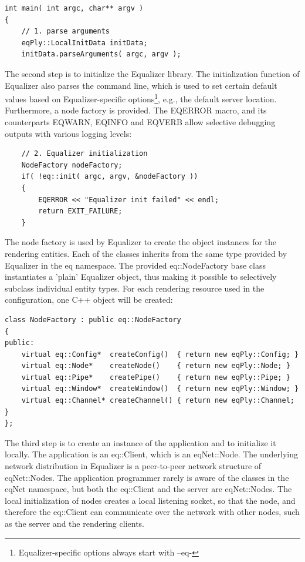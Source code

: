 \documentclass[10pt,a4]{scrartcl}
\begin{document}
{\footnotesize\begin{lstlisting}
int main( int argc, char** argv )
{
    // 1. parse arguments
    eqPly::LocalInitData initData;
    initData.parseArguments( argc, argv );
\end{lstlisting}}

The second step is to initialize the Equalizer library. The
initialization function of Equalizer also parses the command line, which
is used to set certain default values based on Equalizer-specific
options\footnote{Equalizer-specific options always start with --eq-},
e.g., the default server location. Furthermore, a node factory is
provided. The \textsf{EQERROR} macro, and its counterparts
\textsf{EQWARN}, \textsf{EQINFO} and \textsf{EQVERB} allow selective
debugging outputs with various logging levels:

{\footnotesize\begin{lstlisting}
    // 2. Equalizer initialization
    NodeFactory nodeFactory;
    if( !eq::init( argc, argv, &nodeFactory ))
    {
        EQERROR << "Equalizer init failed" << endl;
        return EXIT_FAILURE;
    }
\end{lstlisting}}%

The node factory is used by Equalizer to create the object instances for
the rendering entities. Each of the classes inherits from the same type
provided by Equalizer in the \textsf{eq} namespace. The provided
\textsf{eq::NodeFactory} base class instantiates a 'plain' Equalizer
object, thus making it possible to selectively subclass individual
entity types. For each rendering resource used in the configuration, one
C++ object will be created:

{\footnotesize\begin{lstlisting}
class NodeFactory : public eq::NodeFactory
{
public:
    virtual eq::Config*  createConfig()  { return new eqPly::Config; }
    virtual eq::Node*    createNode()    { return new eqPly::Node; }
    virtual eq::Pipe*    createPipe()    { return new eqPly::Pipe; }
    virtual eq::Window*  createWindow()  { return new eqPly::Window; }
    virtual eq::Channel* createChannel() { return new eqPly::Channel; }
};
\end{lstlisting}}

The third step is to create an instance of the application and to
initialize it locally. The application is an \textsf{eq::Client}, which
is an \textsf{eqNet::Node}. The underlying network distribution in
Equalizer is a peer-to-peer network structure of
\textsf{eqNet::Node}s. The application programmer rarely is aware of the
classes in the \textsf{eqNet} namespace, but both the
\textsf{eq::Client} and the server are \textsf{eqNet::Node}s. The local
initialization of nodes creates a local listening socket, so that the
node, and therefore the \textsf{eq::Client} can communicate over the
network with other nodes, such as the server and the rendering clients.
\end{document}
